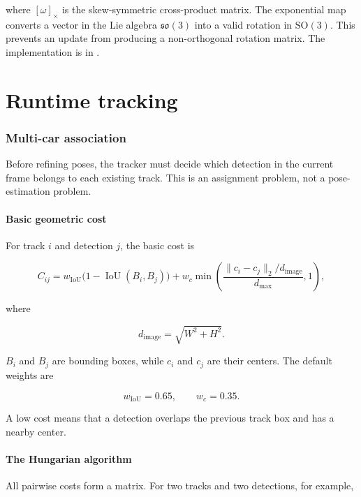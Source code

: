 \documentclass[11pt]{article}
\newcommand{\SO}{\mathrm{SO}}
\newcommand{\IoU}{\operatorname{IoU}}
\begin{document}
where $[\omega]_\times$ is the skew-symmetric cross-product matrix. The
exponential map converts a vector in the Lie algebra $\mathfrak{so}(3)$ into a
valid rotation in $\SO(3)$. This prevents an update from producing a
non-orthogonal rotation matrix. The implementation is in
.

\part{Runtime tracking}

\section{Multi-car association}

Before refining poses, the tracker must decide which detection in the current
frame belongs to each existing track. This is an assignment problem, not a
pose-estimation problem.

\subsection{Basic geometric cost}

For track $i$ and detection $j$, the basic cost is

\begin{equation}
C_{ij}=
w_{\mathrm{IoU}}\bigl(1-\IoU(B_i,B_j)\bigr)
+w_c
\min\left(
\frac{\lVert c_i-c_j\rVert_2/d_{\mathrm{image}}}{d_{\max}},
1
\right),
\end{equation}

where

\begin{equation}
d_{\mathrm{image}}=\sqrt{W^2+H^2}.
\end{equation}

$B_i$ and $B_j$ are bounding boxes, while $c_i$ and $c_j$ are their centers.
The default weights are

\begin{equation}
w_{\mathrm{IoU}}=0.65,
\qquad
w_c=0.35.
\end{equation}

A low cost means that a detection overlaps the previous track box and has a
nearby center.

\subsection{The Hungarian algorithm}

All pairwise costs form a matrix. For two tracks and two detections, for
example,
\end{document}
